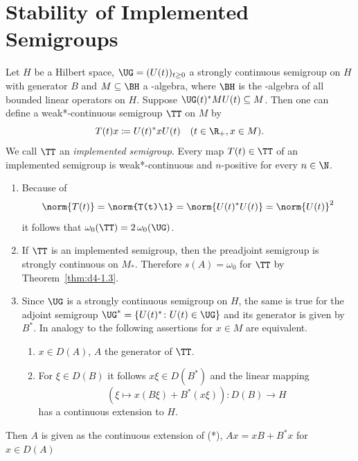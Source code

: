 \section{Stability of Implemented Semigroups}
Let $H$ be a Hilbert space, $\UG = (U(t))_{t \geq 0}$ a strongly continuous semigroup on $H$ with generator $B$ and $M \subseteq \BH$ a \WA-algebra, where $\BH$ is the \WA-algebra of all bounded linear operators on $H$.
Suppose $\UG(t)^{*}MU(t) \subseteq M$.
Then one can define a weak*-continuous semigroup $\TT$ on $M$ by 
%
\[
	T(t)x \coloneqq U(t)^{*}xU(t) \quad (t \in \R_{+}, x \in M) .
\]
%
We call $\TT$ an \emph{implemented semigroup}.
%
%
Every map $T(t) \in \TT$ of an implemented semigroup is weak*-continuous and $n$-positive for every $n \in \N$.
\begin{remarks}\label{rem:d4-2.1}

\begin{enumerate}[\upshape (i), wide, labelindent=.25em]
\item\label{item:d4-2.1-i}
Because of
\[
	\norm{T(t)} = \norm{T(t)\1} = \norm{U(t)^{*}U(t)} = \norm{U(t)}^2
\]
it follows that $\omega_{0}(\TT) = 2\,\omega_{0}(\UG)$.

\item\label{item:d4-2.1-ii}
If\/ $\TT$ is an implemented semigroup, then the preadjoint semigroup is strongly continuous on $M_{*}$.
Therefore $s(A) = \omega_{0}$ for $\TT$ by Theorem~\ref{thm:d4-1.3}.

\item\label{item:d4-2.1-iii}
Since $\UG$ is a strongly continuous semigroup on $ H $, the same is true for the adjoint semigroup 
$\UG^{*} = \{ U(t)^{*} \colon U(t) \in \UG \}$ and its generator is given by $B^{*}$.
In analogy to \textcite[3.2.55]{brattelirobinson:1979} the following assertions for $x \in M$ are equivalent.
\begin{enumerate}[\upshape (a)]
\item
$x \in D(A)$, $ A $ the generator of\/ $ \TT $.

\item
For $\xi \in D(B)$ it follows $x\xi \in D(B^{*})$ and the linear mapping
\begin{equation}
	(\xi \mapsto x(B\xi)+B^{*}(x\xi)): D(B) \to H \tag{*}
\end{equation}
has a continuous extension to $H$.
\end{enumerate}
\end{enumerate}
\end{remarks}
Then $A$ is given as the continuous extension of (*), \ie  $Ax = xB + B^{*}x$ for $ x \in D(A) $


